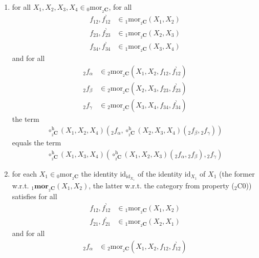 \begin{enumerate}
\item[(${}_{2}$C1)]
for all $X_{1},X_{2},X_{3},X_{4} \in {}_{0}\mathrm{mor}_{{}_{2}\mathbf{C}}$, for all
\begin{align*}
  f_{12},f_{12}^{\backprime}
  &\in
  {}_{1}\mathrm{mor}_{{}_{2}\mathbf{C}}(X_{1},X_{2})
  \\
  f_{23},f_{23}^{\backprime}
  &\in
  {}_{1}\mathrm{mor}_{{}_{2}\mathbf{C}}(X_{2},X_{3})
  \\
  f_{34},f_{34}^{\backprime}
  &\in
  {}_{1}\mathrm{mor}_{{}_{2}\mathbf{C}}(X_{3},X_{4})
\end{align*}
and for all
\begin{align*}
  {}_{2}f_{\alpha}
  &\in
  {}_{2}\mathrm{mor}_{{}_{2}\mathbf{C}}(X_{1},X_{2},f_{12},f_{12}^{\backprime})
  \\
  {}_{2}f_{\beta}
  &\in
  {}_{2}\mathrm{mor}_{{}_{2}\mathbf{C}}(X_{2},X_{3},f_{23},f_{23}^{\backprime})
  \\
  {}_{2}f_{\gamma}
  &\in
  {}_{2}\mathrm{mor}_{{}_{2}\mathbf{C}}(X_{3},X_{4},f_{34},f_{34}^{\backprime})
\end{align*}
the term
\begin{align*}
  \circ_{{}_{2}\mathbf{C}}^{\textrm{h}}
  (X_{1},X_{2},X_{4})
  \left(
    {}_{2}f_{\alpha},
    \circ_{{}_{2}\mathbf{C}}^{\textrm{h}}
    (X_{2},X_{3},X_{4})
    ({}_{2}f_{\beta},{}_{2}f_{\gamma})
  \right)
\end{align*}
equals the term
\begin{align*}
  \circ_{{}_{2}\mathbf{C}}^{\textrm{h}}
  (X_{1},X_{3},X_{4})
  \left(
    \circ_{{}_{2}\mathbf{C}}^{\textrm{h}}
    (X_{1},X_{2},X_{3})
    ({}_{2}f_{\alpha},{}_{2}f_{\beta}),
    {}_{2}f_{\gamma}
  \right)
\end{align*}
\item[(${}_{2}$C2)]
for each $X_{1} \in {}_{0}\mathrm{mor}_{{}_{2}\mathbf{C}}$ the identity $\mathrm{id}_{\mathrm{id}_{X_{1}}}$ of the identity $\mathrm{id}_{X_{1}}$ of $X_{1}$ (the former w.r.t. ${}_{1}\mathbf{mor}_{{}_{2}\mathbf{C}}(X_{1},X_{2})$, the latter w.r.t. the category from property (${}_{2}$C0)) satisfies for all
\begin{align*}
  f_{12},f_{12}^{\backprime}
  &\in
  {}_{1}\mathrm{mor}_{{}_{2}\mathbf{C}}(X_{1},X_{2})
  \\
  f_{21},f_{21}^{\backprime}
  &\in
  {}_{1}\mathrm{mor}_{{}_{2}\mathbf{C}}(X_{2},X_{1})
\end{align*}
and for all
\begin{align*}
  {}_{2}f_{\alpha}
  &\in
  {}_{2}\mathrm{mor}_{{}_{2}\mathbf{C}}(X_{1},X_{2},f_{12},f_{12}^{\backprime})

\end{align*}
\end{enumerate}
